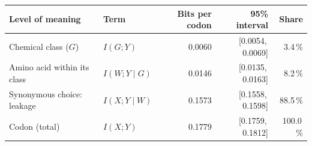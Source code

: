 \begin{tabular}{@{}p{4.5cm} l r r r@{}}
\toprule
Level of meaning & Term & Bits per codon & 95\% interval & Share \\
\midrule
Chemical class ($G$) & $I(G;Y)$ & 0.0060 & [0.0054,\,0.0069] & 3.4\,\% \\
Amino acid within its class & $I(W;Y\mid G)$ & 0.0146 & [0.0135,\,0.0163] & 8.2\,\% \\
Synonymous choice: leakage & $I(X;Y\mid W)$ & 0.1573 & [0.1558,\,0.1598] & 88.5\,\% \\
\midrule
Codon (total) & $I(X;Y)$ & 0.1779 & [0.1759,\,0.1812] & 100.0\,\% \\
\bottomrule
\end{tabular}